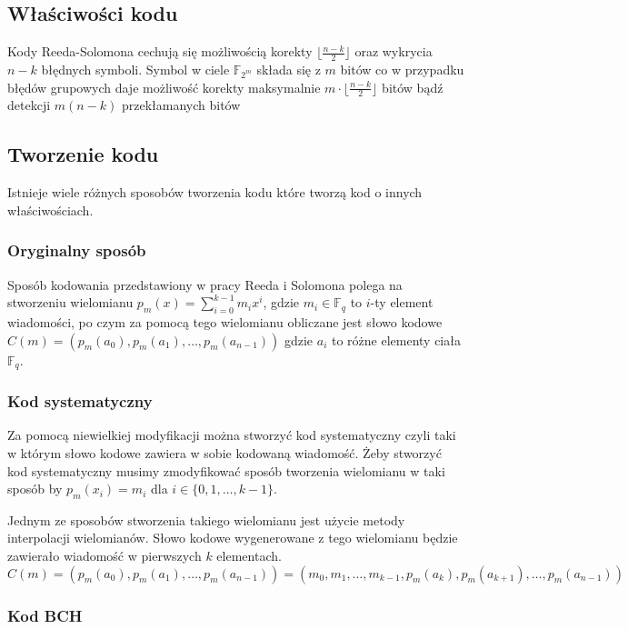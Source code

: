 \subsection{Właściwości kodu}
Kody Reeda-Solomona cechują się możliwością korekty $\lfloor \frac{n-k}{2} \rfloor$
oraz wykrycia $n-k$ błędnych symboli. Symbol w ciele $\mathbb{F}_{2^m}$ składa się
z $m$ bitów co w przypadku błędów grupowych daje możliwość korekty maksymalnie
$m \cdot \lfloor \frac{n-k}{2} \rfloor$ bitów bądź detekcji $m(n-k)$ przekłamanych
bitów

\subsection{Tworzenie kodu}
Istnieje wiele różnych sposobów tworzenia kodu które tworzą kod o innych właściwościach.


\subsubsection{Oryginalny sposób}
Sposób kodowania przedstawiony w pracy Reeda i Solomona polega na stworzeniu wielomianu $p_m(x)=\sum_{i=0}^{k-1}m_{i}x^i$, gdzie $m_i\in\mathbb{F}_q$ to $i$\nobreakdash-ty element wiadomości, po czym za pomocą tego wielomianu obliczane jest słowo kodowe $C(m)=(p_m(a_0), p_m(a_1), \ldots, p_m(a_{n-1}))$ gdzie $a_i$ to różne elementy ciała $\mathbb{F}_q$.

\subsubsection{Kod systematyczny}
\label{subsection:Kod systematyczny}
Za pomocą niewielkiej modyfikacji można stworzyć kod systematyczny czyli taki w którym słowo kodowe zawiera w sobie kodowaną wiadomość.
Żeby stworzyć kod systematyczny musimy zmodyfikować sposób tworzenia wielomianu w taki sposób by $p_m(x_i)=m_i$ dla $i \in \{0,1,\ldots,k-1\}$.

Jednym ze sposobów stworzenia takiego wielomianu jest użycie metody interpolacji wielomianów. Słowo kodowe wygenerowane z tego wielomianu będzie zawierało wiadomość w pierwszych $k$ elementach.
\[C(m)=(p_m(a_0), p_m(a_1), \ldots, p_m(a_{n-1})) = (m_0, m_1, \ldots, m_{k-1}, p_m(a_k), p_m(a_{k+1}), \ldots, p_m(a_{n-1}))\]

\subsubsection{Kod BCH}

